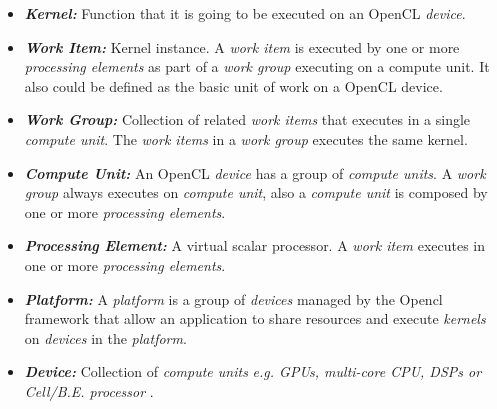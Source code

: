 
\begin{itemize}
    \item\textbf{\textit{Kernel:}} Function that it is going to be executed on an OpenCL \emph{device}\cite{opencl12}. 

    \item\textbf{\textit{Work Item:}} Kernel instance. A \emph{work item} is executed by one or more \emph{processing elements} as 
        part of a \emph{work group} executing on a compute unit\cite{opencl12}. It also could be defined as the basic unit of work
        on a OpenCL device\cite{intro_opencl}.

    \item\textbf{\textit{Work Group:}} Collection of related \emph{work items} that executes in a single \emph{compute unit}. The 
        \emph{work items} in a \emph{work group} executes the same kernel\cite{opencl12}.

    \item\textbf{\textit{Compute Unit:}} An OpenCL \emph{device} has a group of \emph{compute units}. A \emph{work group} always
        executes on \emph{compute unit}, also a \emph{compute unit} is composed by one or more 
        \emph{processing elements}\cite{opencl12}.

    \item\textbf{\textit{Processing Element:}} A virtual scalar processor. A \emph{work item} executes in one or more 
        \emph{processing elements}\cite{opencl12}.

    \item\textbf{\textit{Platform:}} A \emph{platform} is a group of \emph{devices} managed by the Opencl framework 
        that allow an application to share resources and execute \emph{kernels} on \emph{devices} in the 
        \emph{platform}\cite{opencl12}.

    \item\textbf{\textit{Device:}} Collection of \emph{compute units} \emph{e.g. GPUs, multi-core CPU, DSPs or Cell/B.E. processor}
        \cite{opencl12}.
\end{itemize}



